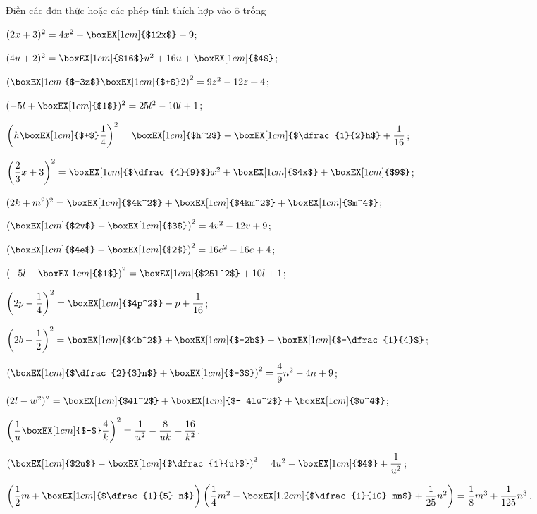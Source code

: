 \begin{vn}
Điền các đơn thức hoặc các phép tính thích hợp vào ô trống
	\begin{listEX}
		\item $(2x+3)^2 = 4x^2 + \boxEX[1cm]{$12x$} + 9$;
		\item $(4u+2)^2 = \boxEX[1cm]{$16$}u^2 + 16u + \boxEX[1cm]{$4$}$;
		\item $\left( \boxEX[1cm]{$-3z$} \boxEX[1cm]{$+$} 2 \right)^2 = 9z^2 - 12z + 4$;
		\item $(-5l+ \boxEX[1cm]{$1$})^2 = 25l^2 -10l + 1$;
		\item $\left(h \boxEX[1cm]{$+$} \dfrac{1}{4}\right)^2 = \boxEX[1cm]{$h^2$} + \boxEX[1cm]{$\dfrac{1}{2}h$} + \dfrac{1}{16}$;
		\item $\left( \dfrac{2}{3}x + 3\right)^2 = \boxEX[1cm]{$\dfrac{4}{9}$}x^2 + \boxEX[1cm]{$4x$} + \boxEX[1cm]{$9$}$;
		\item $(2k+m^2)^2 = \boxEX[1cm]{$4k^2$} + \boxEX[1cm]{$4km^2$} + \boxEX[1cm]{$m^4$}$;
		\item $\left( \boxEX[1cm]{$2v$}-\boxEX[1cm]{$3$} \right)^2 = 4v^2 - 12v + 9$;
		\item $\left( \boxEX[1cm]{$4e$}-\boxEX[1cm]{$2$} \right)^2 = 16e^2 - 16e + 4$;
		\item $\left( -5l-\boxEX[1cm]{$1$}\right)^2 = \boxEX[1cm]{$25l^2$} + 10l + 1$;
		\item $\left(2p - \dfrac{1}{4} \right)^2 = \boxEX[1cm]{$4p^2$} - p + \dfrac{1}{16}$;
		\item $\left(2b - \dfrac{1}{2}\right)^2 = \boxEX[1cm]{$4b^2$} + \boxEX[1cm]{$-2b$} - \boxEX[1cm]{$-\dfrac{1}{4}$}$;
		\item $\left( \boxEX[1cm]{$\dfrac{2}{3}n$} + \boxEX[1cm]{$-3$} \right)^2 = \dfrac{4}{9}n^2 - 4n + 9 $;
		\item $(2l-w^2)^2 = \boxEX[1cm]{$4l^2$} + \boxEX[1cm]{$- 4lw^2$} + \boxEX[1cm]{$w^4$}$;
		\item $\left( \dfrac{1}{u} \boxEX[1cm]{$-$} \dfrac{4}{k} \right)^2 = \dfrac{1}{u^2} - \dfrac{8}{uk} + \dfrac{16}{k^2}$.
		\item $\left( \boxEX[1cm]{$2u$} - \boxEX[1cm]{$\dfrac{1}{u}$} \right)^2 = 4u^2 - \boxEX[1cm]{$4$} + \dfrac{1}{u^2}$;
		\item $\left( \dfrac{1}{2}m + \boxEX[1cm]{$\dfrac{1}{5} n$} \right)\left( \dfrac{1}{4}m^2 - \boxEX[1.2cm]{$\dfrac{1}{10} mn$} + \dfrac{1}{25} n^2\right) = \dfrac{1}{8} m^3 + \dfrac{1}{125} n^3$.
	\end{listEX}
\end{vn}
